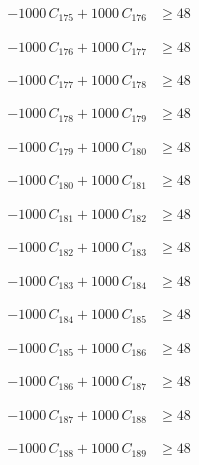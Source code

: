 \documentclass[a4paper,11pt]{article}
\begin{document}
\begin{align}
-1000\,C_{175} + 1000\,C_{176} &\geq 48 \nonumber
\end{align}

\begin{align}
-1000\,C_{176} + 1000\,C_{177} &\geq 48 \nonumber
\end{align}

\begin{align}
-1000\,C_{177} + 1000\,C_{178} &\geq 48 \nonumber
\end{align}

\begin{align}
-1000\,C_{178} + 1000\,C_{179} &\geq 48 \nonumber
\end{align}

\begin{align}
-1000\,C_{179} + 1000\,C_{180} &\geq 48 \nonumber
\end{align}

\begin{align}
-1000\,C_{180} + 1000\,C_{181} &\geq 48 \nonumber
\end{align}

\begin{align}
-1000\,C_{181} + 1000\,C_{182} &\geq 48 \nonumber
\end{align}

\begin{align}
-1000\,C_{182} + 1000\,C_{183} &\geq 48 \nonumber
\end{align}

\begin{align}
-1000\,C_{183} + 1000\,C_{184} &\geq 48 \nonumber
\end{align}

\begin{align}
-1000\,C_{184} + 1000\,C_{185} &\geq 48 \nonumber
\end{align}

\begin{align}
-1000\,C_{185} + 1000\,C_{186} &\geq 48 \nonumber
\end{align}

\begin{align}
-1000\,C_{186} + 1000\,C_{187} &\geq 48 \nonumber
\end{align}

\begin{align}
-1000\,C_{187} + 1000\,C_{188} &\geq 48 \nonumber
\end{align}

\begin{align}
-1000\,C_{188} + 1000\,C_{189} &\geq 48 \nonumber
\end{align}
\end{document}
